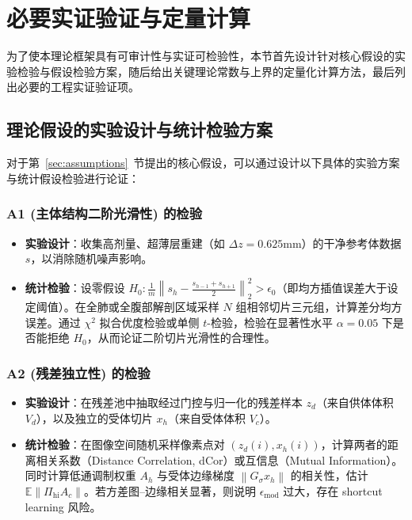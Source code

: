 \documentclass[11pt,a4paper,UTF8,fontset=fandol]{ctexart}
\theoremstyle{definition}
\newcommand{\norm}[1]{\left\lVert#1\right\rVert}
\newcommand{\E}{\mathbb{E}}
\begin{document}
\section{必要实证验证与定量计算}

为了使本理论框架具有可审计性与实证可检验性，本节首先设计针对核心假设的实验检验与假设检验方案，随后给出关键理论常数与上界的定量化计算方法，最后列出必要的工程实证验证项。

\subsection{理论假设的实验设计与统计检验方案}
\label{sec:hypothesis-testing}

对于第~\ref{sec:assumptions}~节提出的核心假设，可以通过设计以下具体的实验方案与统计假设检验进行论证：

\subsubsection{A1 (主体结构二阶光滑性) 的检验}
\begin{itemize}[leftmargin=2em]
    \item \textbf{实验设计}：收集高剂量、超薄层重建（如 $\Delta z = 0.625\text{mm}$）的干净参考体数据 $s$，以消除随机噪声影响。
    \item \textbf{统计检验}：设零假设 $H_0: \frac{1}{m}\norm{s_h - \frac{s_{h-1} + s_{h+1}}{2}}_2^2 > \epsilon_0$（即均方插值误差大于设定阈值）。在全肺或全腹部解剖区域采样 $N$ 组相邻切片三元组，计算差分均方误差。通过 $\chi^2$ 拟合优度检验或单侧 $t$-检验，检验在显著性水平 $\alpha = 0.05$ 下是否能拒绝 $H_0$，从而论证二阶切片光滑性的合理性。
\end{itemize}

\subsubsection{A2 (残差独立性) 的检验}
\begin{itemize}[leftmargin=2em]
    \item \textbf{实验设计}：在残差池中抽取经过门控与归一化的残差样本 $z_d$（来自供体体积 $V_d$），以及独立的受体切片 $x_h$（来自受体体积 $V_c$）。
    \item \textbf{统计检验}：在图像空间随机采样像素点对 $(z_d(i), x_h(i))$，计算两者的距离相关系数（Distance Correlation, dCor）或互信息（Mutual Information）。同时计算低通调制权重 $A_h$ 与受体边缘梯度 $\norm{G_\sigma x_h}$ 的相关性，估计 $\E\norm{\Pi_{\mathrm{hi}}A_c}$。若方差图--边缘相关显著，则说明 $\epsilon_{\mathrm{mod}}$ 过大，存在 shortcut learning 风险。
\end{itemize}
\end{document}
